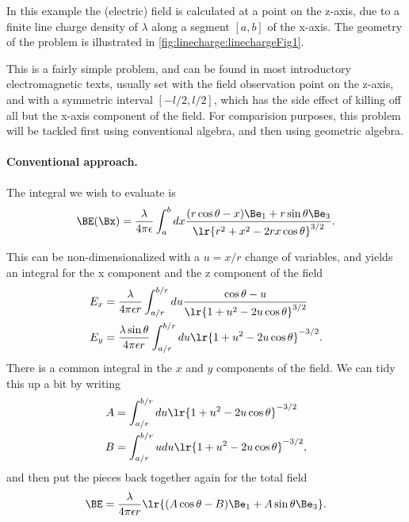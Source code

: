 %
%
In this example the (electric) field is calculated at a point on the z-axis, due to a finite line charge density of \( \lambda \) along a segment \( [a,b] \) of the x-axis.
The geometry of the problem is illustrated in \cref{fig:linecharge:linechargeFig1}.

This is a fairly simple problem, and can be found in most introductory electromagnetic texts, usually set with the field observation point on the z-axis, and with a symmetric interval \( [-l/2, l/2] \), which has the side effect of killing off all but the x-axis component of the field.  For comparision purposes, this problem will be tackled first using conventional algebra, and then using geometric algebra.

\paragraph{Conventional approach.}

The integral we wish to evaluate is
\begin{dmath}\label{eqn:linecharge:160}
\BE(\Bx) = \frac{\lambda}{4 \pi \epsilon} \int_a^b dx \frac{ (r \cos\theta - x) \Be_1 + r \sin\theta \Be_3 }{ \lr{ r^2 + x^2 - 2 r x \cos\theta }^{3/2} }.
\end{dmath}

This can be non-dimensionalized with a \( u = x/r \) change of variables, and yields an integral for the x component and the z component of the field
\begin{equation}\label{eqn:linecharge:180}
\begin{aligned}
E_x &= \frac{\lambda}{4 \pi \epsilon r} \int_{a/r}^{b/r} du \frac{ \cos\theta - u }{ \lr{ 1 + u^2 - 2 u \cos\theta }^{3/2} } \\
E_y &= \frac{\lambda \sin\theta}{4 \pi \epsilon r} \int_{a/r}^{b/r} du \lr{ 1 + u^2 - 2 u \cos\theta }^{-3/2}.
\end{aligned}
\end{equation}
There is a common integral in the \(x\) and \(y\) components of the field.  We can tidy this up a bit by writing
\begin{equation}\label{eqn:linecharge:200}
\begin{aligned}
A &= \int_{a/r}^{b/r} du \lr{ 1 + u^2 - 2 u \cos\theta }^{-3/2} \\
B &= \int_{a/r}^{b/r} u du \lr{ 1 + u^2 - 2 u \cos\theta }^{-3/2},
\end{aligned}
\end{equation}
and then put the pieces back together again for the total field
\begin{dmath}\label{eqn:linecharge:220}
\BE = \frac{\lambda}{4 \pi \epsilon r} \lr{ (A \cos\theta - B) \Be_1 + A \sin\theta \Be_3 }.
\end{dmath}

